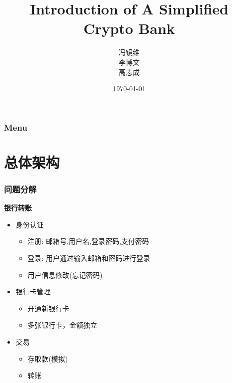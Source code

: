\documentclass[]{beamer}
\title{Introduction of A Simplified Crypto Bank}  %
\author[Jingwei Feng, Bowen Li, Zhicheng Gao]{\begin{tabular}{c} 冯镜维 \\ 李博文 \\ 高志成 \end{tabular}}
\date{\today}  %
\begin{document}

    \begin{frame}  %
        \titlepage  %
    \end{frame}

    \begin{frame}
        \frametitle{Menu}  %
        \tableofcontents  %
    \end{frame}
    
    \section{总体架构}  %
    \begin{frame}  
        \frametitle{问题分解}  
        \textbf{银行转账}
        \begin{itemize}  
            \item 身份认证
            \begin{itemize}
                \item 注册: 邮箱号,用户名,登录密码,支付密码
                \item 登录: 用户通过输入邮箱和密码进行登录
                \item 用户信息修改(忘记密码)
            \end{itemize}
            \item 银行卡管理
            \begin{itemize}
                \item 开通新银行卡
                \item 多张银行卡，金额独立
            \end{itemize}
            \item 交易
            \begin{itemize}
                \item 存取款(模拟)
                \item 转账
            \end{itemize}
        \end{itemize}
    \end{frame}
\end{document}
